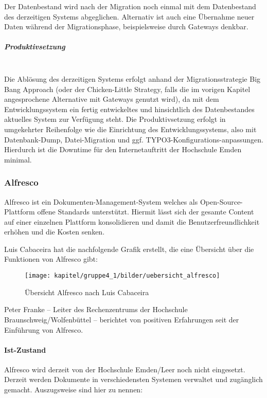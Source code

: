 Der Datenbestand wird nach der Migration noch einmal mit dem Datenbestand des derzeitigen Systems abgeglichen. Alternativ ist auch eine Übernahme neuer Daten während der Migrationsphase, beispielsweise durch Gateways denkbar. 

\subparagraph{Produktivsetzung}\mbox{}\\
Die Ablösung des derzeitigen Systems erfolgt anhand der Migrationsstrategie Big Bang Approach (oder der Chicken-Little Strategy, falls die im vorigen Kapitel angesprochene Alternative mit Gateways genutzt wird), da mit dem Entwicklungssystem ein fertig entwickeltes und hinsichtlich des Datenbestandes aktuelles System zur Verfügung steht. Die Produktivsetzung erfolgt in umgekehrter Reihenfolge wie die Einrichtung des Entwicklungssystems, also mit Datenbank-Dump, Datei-Migration und ggf. TYPO3-Konfigurations-anpassungen. Hierdurch ist die Downtime für den Internetauftritt der Hochschule Emden minimal.

\subsubsection{Alfresco}
\label{subsubsection_migration_alfresco}
Alfresco\cite{alfresco_solutions_2015} ist ein Dokumenten-Management-System welches als Open-Source-Plattform offene Standards unterstützt. Hiermit lässt sich der gesamte Content auf einer einzelnen Plattform konsolidieren und damit die Benutzerfreundlichkeit erhöhen und die Kosten senken.

Luis Cabaceira\cite{cabaceira_alfresco_2015} hat die nachfolgende Grafik erstellt, die eine Übersicht über die Funktionen von Alfresco gibt:

\begin{figure}[h!]
	\centering
	\texttt{[image: kapitel/gruppe4\_1/bilder/uebersicht\_alfresco]}
	\caption{Übersicht Alfresco nach Luis Cabaceira}
	\label{fig_uebersicht_alfresco}
\end{figure}

Peter Franke – Leiter des Rechenzentrums der Hochschule Braunschweig/Wolfenbüttel – berichtet von positiven Erfahrungen seit der Einführung von Alfresco.\cite{franke_alfresco_2011}

\paragraph{Ist-Zustand}
Alfresco wird derzeit von der Hochschule Emden/Leer noch nicht eingesetzt. Derzeit werden Dokumente in verschiedensten Systemen verwaltet und zugänglich gemacht. Auszugsweise sind hier zu nennen:

